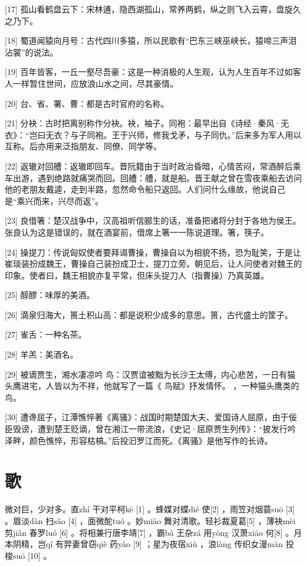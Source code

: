 \documentclass[12pt,UTF8]{ctexbook}
\begin{document}
[17] 孤山看鹤盘云下：宋林逋，隐西湖孤山，常养两鹤，纵之则飞入云霄，盘旋久之乃下。

[18] 蜀道闻猿向月号：古代四川多猿，所以民歌有“巴东三峡巫峡长，猿啼三声泪沾裳”的说法。

[19] 百年皆客，一丘一壑尽吾豪：这是一种消极的人生观，认为人生百年不过如客人一样暂住世间，应放浪山水之间，尽其豪情。

[20] 台、省、署、曹：都是古时官府的名称。

[21] 分袂：古时把离别称作分袂。袂，袖子。同袍：最早出自《诗经·秦风·无衣》：“岂曰无衣？与子同袍。王于兴师，修我戈矛，与子同仇。”后来多为军人用以互称。后亦用来泛指朋友、同僚、同学等。

[22] 返辙对回艚：返辙即回车。晋阮籍由于当时政治昏暗，心情苦闷，常酒醉后乘车出游，遇到绝路就痛哭而回。回艚：艚，就是船。晋王献之曾在雪夜乘船去访问他的老朋友戴逵，走到半路，忽然命令船只返回。人们问什么缘故，他说自己是“乘兴而来，兴尽而返”。

[23] 良借箸：楚汉战争中，汉高祖听信郦生的话，准备把诸将分封于各地为侯王。张良认为这是错误的，就在酒宴前，借席上箸一一陈说道理。箸，筷子。

[24] 操提刀：传说匈奴使者要拜谒曹操，曹操自以为相貌不扬，恐为耻笑，于是让崔琰装扮成魏王，曹操自己装扮成卫士，提刀立旁。朝见后，让人问使者对魏王的印象。使者曰，魏王相貌亦复平常，但床头捉刀人（指曹操）乃真英雄。

[25] 醇醪：味厚的美酒。

[26] 滴泉归海大，篑土积山高：都是说积少成多的意思。篑，古代盛土的筐子。

[27] 雀舌：一种名茶。

[28] 羊羔：美酒名。

[29] 被谪贾生，湘水凄凉吟 鸟：汉贾谊被黜为长沙王太傅，内心悲苦，一日有猫头鹰进宅，人皆以为不祥，他就写了一篇《 鸟赋》抒发情怀。 ，一种猫头鹰类的鸟。

[30] 遭谗屈子，江潭憔悴著《离骚》：战国时期楚国大夫、爱国诗人屈原，由于佞臣毁谤，遭到楚王贬谪，曾在湘江一带流浪，《史记·屈原贾生列传》：“披发行吟泽畔，颜色憔悴，形容枯槁。”后投汩罗江而死。《离骚》是他写作的长诗。





\chapter{歌}


微对巨，少对多。直zhí 干对平柯kē [1] 。蜂媒对蝶dié 使[2] ，雨笠对烟蓑suō [3] 。眉淡dàn 扫sǎo [4] ，面微酡tuó 。妙miào 舞对清歌。轻衫裁夏葛[5] ，薄袂mèi 剪jiǎn 春罗luó [6] 。将相兼行唐李靖[7] ，霸bà 王杂zá 用yòng 汉萧xiāo 何[8] 。月本阴精，岂qǐ 有羿妻曾窃qiè 药yào [9] ；星为夜宿xiù ，浪làng 传织女漫màn 投梭suō [10] 。
\end{document}
